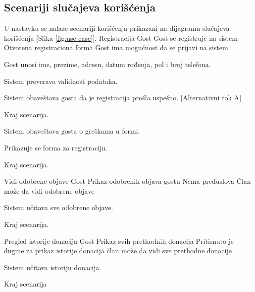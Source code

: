 \subsection{Scenariji slučajeva korišćenja}
\par U nastavku se nalaze scenariji korišćenja prikazani na dijagramu slučajeva korišćenja [Slika \ref{fig:use-case}].
        {Registracija}
        {Gost}
        {Gost se registruje na sistem}
        {Otvorena registraciona forma}
        {Gost ima mogućnost da se prijavi na sistem}
        {
            \item Gost unosi ime, prezime, adresu, datum rođenja, pol i broj telefona.
            \item Sistem proverava validnost podataka.
            \item Sistem obaveštava gosta da je registracija prošla uspešno. [Alternativni tok A]
            \item Kraj scenarija.
        }
        {
            {
                \item Sistem obaveštava gosta o greškama u formi.
                \item Prikazuje se forma za registraciju.
                \item Kraj scenarija.
            }
        }
          {Vidi odobrene objave}
          {Gost}
          {Prikaz odobrenih objava gostu}
          {Nema preduslova}
          {Član može da vidi odobrene objave}
          {
            \item Sistem učitava sve odobrene objave.
            \item Kraj scenarija.
          }
          {}

         {Pregled istorije donacija}
         {Gost}
         {Prikaz svih prethodnih donacija}
         {Pritisnuto je dugme za prikaz istorije donacija}
         {član može da vidi sve prethodne donacije}
         {
            \item Sistem učitava istoriju donacija.
            \item Kraj scenarija
         }
         {}


